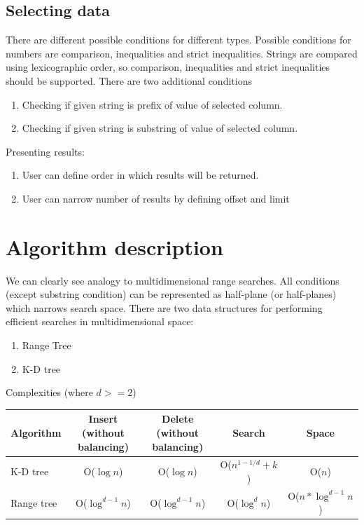 \documentclass{llncs}
\begin{document}
\subsection{Selecting data}
There are different possible conditions for different types. Possible conditions for numbers are comparison, inequalities and strict inequalities. Strings are compared using lexicographic order, so comparison, inequalities and strict inequalities should be supported. There are two additional conditions
\begin{enumerate}
\item Checking if given string is prefix of value of selected column. 
\item Checking if given string is substring of value of selected column. 
\end{enumerate}
Presenting results:
\begin{enumerate}
\item User can define order in which results will be returned.
\item User can narrow number of results by defining offset and limit
\end{enumerate}

\section{Algorithm description}
We can clearly see analogy to multidimensional range searches. All conditions (except substring condition) can be represented as half-plane (or half-planes) which narrows search space. There are two data structures for performing efficient searches in multidimensional space:

\begin{enumerate}
\item Range Tree \cite{CGAAA}
\item K-D tree \cite{CGAAA}
\end{enumerate}

Complexities (where $d>=2$)

\begin{tabular}{|l|c|c|c|c|}
\hline Algorithm & Insert (without balancing) & Delete (without balancing) & Search & Space \\
\hline K-D tree & O($\log{n}$) & O($\log{n}$) & O($n^{1-1/d} + k$) & O($n$) \\
\hline Range tree & O($\log^{d-1}{n}$) & O($\log^{d-1}{n}$) & O($\log^d{n}$) & O($n*\log^{d-1}{n}$) \\
\hline 
\end{tabular}
\end{document}
